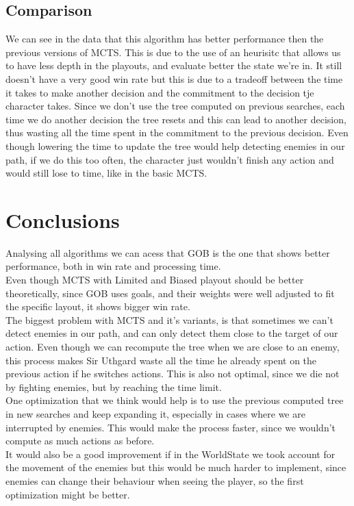 \documentclass{article}
\begin{document}
  \subsection{Comparison}
  We can see in the data that this algorithm has better performance then the previous versions of MCTS. This is due to the use of an heurisitc that allows us to have less
  depth in the playouts, and evaluate better the state we're in. 
  It still doesn't have a very good win rate but this is due to a tradeoff between the time it takes to make another decision and the commitment to the decision tje
  character takes. Since we don't use the tree computed on previous searches, each time we do another decision the tree resets and this can lead to another decision,
  thus wasting all the time spent in the commitment to the previous decision. Even though lowering the time to update the tree would help detecting enemies in our path,
  if we do this too often, the character just wouldn't finish any action and would still lose to time, like in the basic MCTS.\\

  \section{Conclusions}
  Analysing all algorithms we can acess that GOB is the one that shows better performance, both in win rate and processing time.\\
  Even though MCTS with Limited and Biased playout should be better theoretically, since GOB uses goals, and their weights were well adjusted to fit the 
  specific layout, it shows bigger win rate.\\
  The biggest problem with MCTS and it's variants, is that sometimes we can't detect enemies in our path, and can only detect them close to the target of our action.
  Even though we can recompute the tree when we are close to an enemy, this process makes Sir Uthgard waste all the time he already spent on the previous action if he switches
  actions. This is also not optimal, since we die not by fighting enemies, but by reaching the time limit. \\
  One optimization that we think would help is to use the previous computed tree in new searches and keep expanding it, especially in cases where we are interrupted by enemies. 
  This would make the process faster, since we wouldn't compute as much actions as before.\\
  It would also be a good improvement if in the WorldState we took account for the movement of the enemies but this would be much harder to implement, since enemies can
  change their behaviour when seeing the player, so the first optimization might be better.
\end{document}
